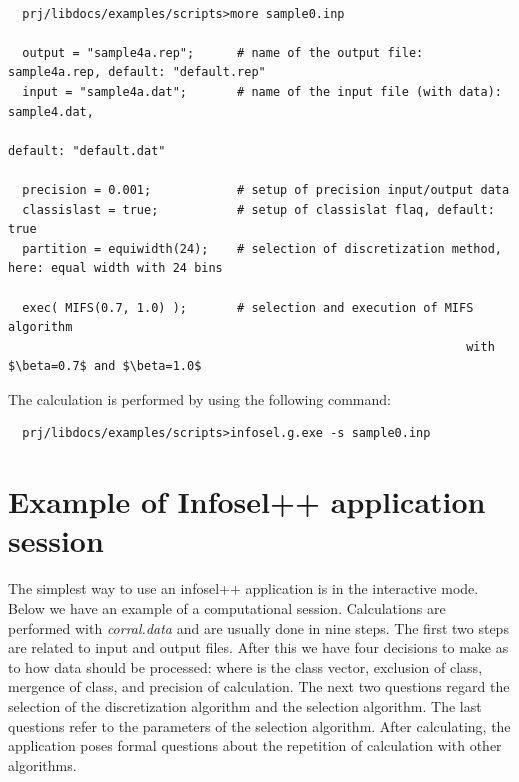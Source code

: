\documentclass[a4paper,fleqn]{report}
\begin{document}
\begin{scriptsize}
 \begin{verbatim}

  prj/libdocs/examples/scripts>more sample0.inp

  output = "sample4a.rep";      # name of the output file: sample4a.rep, default: "default.rep"
  input = "sample4a.dat";       # name of the input file (with data): sample4.dat, 
                                                                          default: "default.dat"

  precision = 0.001;            # setup of precision input/output data 
  classislast = true;           # setup of classislat flaq, default: true
  partition = equiwidth(24);    # selection of discretization method, here: equal width with 24 bins

  exec( MIFS(0.7, 1.0) );       # selection and execution of MIFS algorithm 
                                                                with $\beta=0.7$ and $\beta=1.0$
 \end{verbatim}
\end{scriptsize}

The calculation is performed by using the following command:
\ \\
\begin{scriptsize}
  \begin{verbatim}
  prj/libdocs/examples/scripts>infosel.g.exe -s sample0.inp
  \end{verbatim}
\end{scriptsize}



\section{Example of Infosel++ application session}

The simplest way to use an infosel++ application is in the interactive mode. Below we have an example of a computational session. 
Calculations are performed with {\it corral.data} and are usually done in nine steps. The first two steps are related to
input and output files. After this we have four decisions to make as to how data should be processed: 
where is the class vector, exclusion of class, mergence of class, and precision of calculation. 
The next two questions regard the selection
of the discretization algorithm and the selection algorithm. The last questions refer to the parameters of the selection algorithm. 
After calculating, the application poses formal questions about the repetition of calculation with other algorithms.
\end{document}
